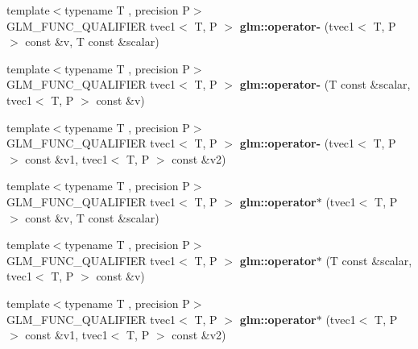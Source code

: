 \begin{DoxyCompactItemize}
\item 
\hypertarget{namespaceglm_a7893a1624d352d34f141c279e6fa9452}{{\footnotesize template$<$typename T , precision P$>$ }\\G\-L\-M\-\_\-\-F\-U\-N\-C\-\_\-\-Q\-U\-A\-L\-I\-F\-I\-E\-R tvec1$<$ T, P $>$ {\bfseries glm\-::operator-\/} (tvec1$<$ T, P $>$ const \&v, T const \&scalar)}\label{namespaceglm_a7893a1624d352d34f141c279e6fa9452}

\item 
\hypertarget{namespaceglm_a5ca94702bff9eaf4009be2d43958826e}{{\footnotesize template$<$typename T , precision P$>$ }\\G\-L\-M\-\_\-\-F\-U\-N\-C\-\_\-\-Q\-U\-A\-L\-I\-F\-I\-E\-R tvec1$<$ T, P $>$ {\bfseries glm\-::operator-\/} (T const \&scalar, tvec1$<$ T, P $>$ const \&v)}\label{namespaceglm_a5ca94702bff9eaf4009be2d43958826e}

\item 
\hypertarget{namespaceglm_a1c711f6ec4149bf2353559dce01d3905}{{\footnotesize template$<$typename T , precision P$>$ }\\G\-L\-M\-\_\-\-F\-U\-N\-C\-\_\-\-Q\-U\-A\-L\-I\-F\-I\-E\-R tvec1$<$ T, P $>$ {\bfseries glm\-::operator-\/} (tvec1$<$ T, P $>$ const \&v1, tvec1$<$ T, P $>$ const \&v2)}\label{namespaceglm_a1c711f6ec4149bf2353559dce01d3905}

\item 
\hypertarget{namespaceglm_a9998fa8847fdf88228acd68e83d28ed5}{{\footnotesize template$<$typename T , precision P$>$ }\\G\-L\-M\-\_\-\-F\-U\-N\-C\-\_\-\-Q\-U\-A\-L\-I\-F\-I\-E\-R tvec1$<$ T, P $>$ {\bfseries glm\-::operator$\ast$} (tvec1$<$ T, P $>$ const \&v, T const \&scalar)}\label{namespaceglm_a9998fa8847fdf88228acd68e83d28ed5}

\item 
\hypertarget{namespaceglm_a979e81110fa3ebecc334a84e626e6101}{{\footnotesize template$<$typename T , precision P$>$ }\\G\-L\-M\-\_\-\-F\-U\-N\-C\-\_\-\-Q\-U\-A\-L\-I\-F\-I\-E\-R tvec1$<$ T, P $>$ {\bfseries glm\-::operator$\ast$} (T const \&scalar, tvec1$<$ T, P $>$ const \&v)}\label{namespaceglm_a979e81110fa3ebecc334a84e626e6101}

\item 
\hypertarget{namespaceglm_a5e9aeb3518efcd20d4f0ab05b7c69c0d}{{\footnotesize template$<$typename T , precision P$>$ }\\G\-L\-M\-\_\-\-F\-U\-N\-C\-\_\-\-Q\-U\-A\-L\-I\-F\-I\-E\-R tvec1$<$ T, P $>$ {\bfseries glm\-::operator$\ast$} (tvec1$<$ T, P $>$ const \&v1, tvec1$<$ T, P $>$ const \&v2)}\label{namespaceglm_a5e9aeb3518efcd20d4f0ab05b7c69c0d}


\end{DoxyCompactItemize}
